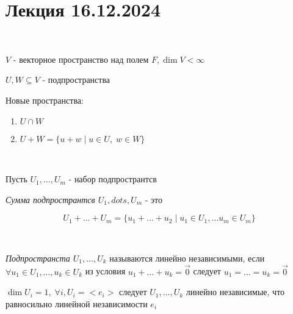 \section{Лекция 16.12.2024}


\begin{lemma}~
    
    $V$ - векторное пространство над полем $F, \dim V < \infty$
    
    $U, W \subseteq V$ - подпространства
    
    Новые пространства:

    \begin{enumerate}
        \item $U \cap W$
        \item $U + W = \{u + w \; | \; u \in U, \; w \in W\}$
    \end{enumerate}

    \begin{comment}
        
        $$\dim(U \cap W) + \dim(U + W) = \dim U + \dim W$$

    \end{comment}

\end{lemma}


\bigskip


\begin{definition}~
    
    Пусть $U_1, \dots, U_m$ - набор подпространтсв

    \textit{Сумма подпространтсв $U_1, dots, U_m$} - это 
    
    $$U_1 + \dots + U_m = \{u_1 + \dots + u_2 \; | \; u_1 \in U_1, \dots u_m \in U_m\}$$

    \begin{comment}
        
        Сумма подпространств является подпространством.

        $$\dim(U_1 + \dots + U_m) \leq \dim U_1 + \dots + \dim U_m$$

    \end{comment}

\end{definition}


\bigskip


\begin{definition}~
    
    \textit{Подпространста $U_1, \dots, U_k$} называются линейно независимыми, если $\forall u_1 \in U_1, \dots, u_k \in U_k$ из условия $u_1 + \dots + u_k = \vec{0}$ следует $u_1 = \dots = u_k = \vec{0}$

    \begin{example}
        
        $\dim U_i = 1, \; \forall i, U_i = <e_i>$ следует $U_1, \dots, U_k$ линейно независимые, что равносильно линейной независимости $e_i$

    \end{example}

\end{definition}


